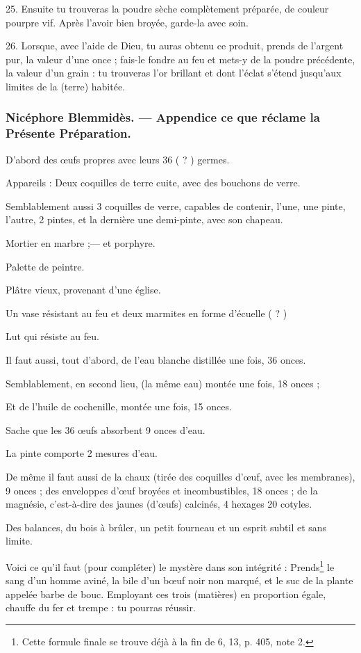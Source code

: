 \documentclass[a4paper, 11pt, oneside, polutonikogreek, french]{article}
\begin{document}
25. Ensuite tu trouveras la poudre sèche complètement préparée, de couleur pourpre vif. Après l'avoir bien broyée, garde-la avec soin.

26. Lorsque, avec l'aide de Dieu, tu auras obtenu ce produit, prends de l'argent pur, la valeur d'une once ; fais-le fondre au feu et mets-y de la poudre précédente, la valeur d'un grain : tu trouveras l'or brillant et dont l'éclat s'étend jusqu'aux limites de la (terre) habitée.

\bigskip
\centerline{\EightStarTaper}
\centerline{\EightStarTaper\EightStarTaper}
\bigskip

\subsubsection{Nicéphore Blemmidès. --- Appendice ce que réclame la Présente Préparation.}

D'abord des œufs propres avec leurs 36 ( ? ) germes.

Appareils : Deux coquilles de terre cuite, avec des bouchons de verre.

Semblablement aussi 3 coquilles de verre, capables de contenir, l'une, une pinte, l'autre, 2 pintes, et la dernière une demi-pinte, avec son chapeau.

Mortier en marbre ;--- et porphyre.

Palette de peintre.

Plâtre vieux, provenant d'une église.

Un vase résistant au feu et deux marmites en forme d'écuelle ( ? )

Lut qui résiste au feu.

Il faut aussi, tout d'abord, de l'eau blanche distillée une fois, 36 onces.

Semblablement, en second lieu, (la même eau) montée une fois, 18 onces ;

Et de l'huile de cochenille, montée une fois, 15 onces.

Sache que les 36 œufs absorbent 9 onces d'eau.

La pinte comporte 2 mesures d'eau.

De même il faut aussi de la chaux (tirée des coquilles d'œuf, avec les membranes), 9 onces ; des enveloppes d'œuf broyées et incombustibles, 18 onces ; de la magnésie, c'est-à-dire des jaunes (d'œufs) calcinés, 4 hexages 20 cotyles.

Des balances, du bois à brûler, un petit fourneau et un esprit subtil et sans limite.

Voici ce qu'il faut (pour compléter) le mystère dans son intégrité : Prends\footnote{Cette formule finale se trouve déjà à la fin de 6, 13, p. 405, note 2.} le sang d'un homme aviné, la bile d'un bœuf noir non marqué, et le suc de la plante appelée barbe de bouc. Employant ces trois (matières) en proportion égale, chauffe du fer et trempe : tu pourras réussir.

\bigskip
\centerline{\EightStarTaper}
\centerline{\EightStarTaper\EightStarTaper}
\bigskip
\end{document}
